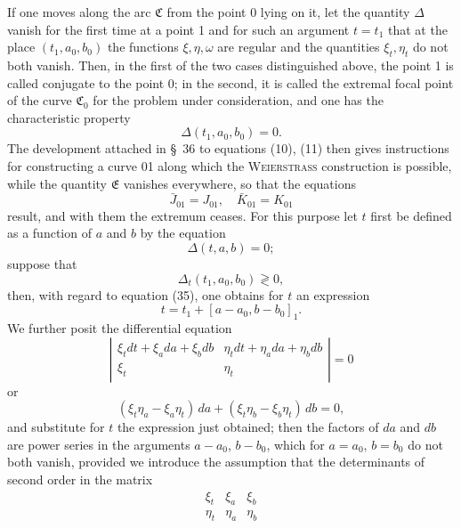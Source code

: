 \documentclass[11pt,a4paper,leqno]{article}
\begin{document}
If one moves along the arc $\mathfrak{C}$ from the point 0 lying on it, let the quantity $\Delta$ vanish for the first time at a point 1 and for such an argument $t=t_1$ that at the place $(t_1,a_0,b_0)$ the functions $\xi,\eta,\omega$ are regular and the quantities $\xi_t,\eta_t$ do not both vanish. Then, in the first of the two cases distinguished above, the point 1 is called conjugate to the point 0; in the second, it is called the extremal focal point of the curve $\mathfrak{C}_0$ for the problem under consideration, and one has the characteristic property
\begin{equation}\tag{35}
\Delta(t_1,a_0,b_0)=0.
\end{equation}
The development attached in \S~36 to equations (10), (11) then gives instructions for constructing a curve 01 along
which the \textsc{Weierstrass} construction is possible, while the quantity $\mathfrak{E}$ vanishes everywhere, so that the equations
\begin{equation}\tag{36}
\bar J_{01}=J_{01},\quad \bar K_{01}=K_{01}
\end{equation}
result, and with them the extremum ceases. For this purpose let $t$ first be defined as a function of $a$ and $b$ by the equation
\begin{equation}\tag{37}
\Delta(t,a,b)=0;
\end{equation}
suppose that
\[
\Delta_t(t_1,a_0,b_0)\gtrless 0,
\]
then, with regard to equation (35), one obtains for $t$ an expression
\[
t=t_1+[a-a_0,b-b_0]_1.
\]
We further posit the differential equation
\[
\left|\begin{array}{cc}
\xi_tdt+\xi_a da+\xi_b db&\eta_tdt+\eta_a da+\eta_b db\\[.6ex]
\xi_t&\eta_t
\end{array}\right|=0
\]
or
\begin{equation}\tag{38}
(\xi_t\eta_a-\xi_a\eta_t)\,da+(\xi_t\eta_b-\xi_b\eta_t)\,db=0,
\end{equation}
and substitute for $t$ the expression just obtained; then the factors of $da$ and $db$ are power series in the arguments $a-a_0$, $b-b_0$, which for $a=a_0$, $b=b_0$ do not both vanish, provided we introduce the assumption that the determinants of second order in the matrix
\begin{equation}\tag{39}
\begin{array}{ccc}
\xi_t&\xi_a&\xi_b\\
\eta_t&\eta_a&\eta_b
\end{array}
\end{equation}
\end{document}
